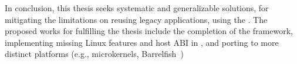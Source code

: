 






In conclusion, this thesis seeks systematic and generalizable solutions,
for mitigating the limitations on
reusing legacy applications,
using the \graphene{} \libos{}.
The proposed works for fulfilling the thesis include
the completion of the \civet{} framework, 
implementing missing Linux features and host ABI in \graphene{},
and porting \graphene{} to more distinct platforms (e.g., microkernels, Barrelfish~\cite{baumann09barrelfish})



